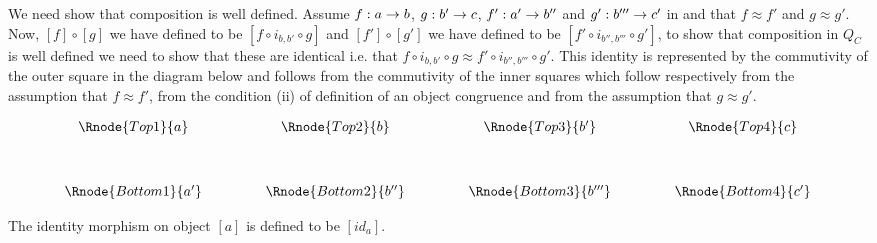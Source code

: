 \documentclass[10pt,a4paper]{scrartcl}
\begin{document}
We need show that composition is well defined.  Assume $f:a \rightarrow b$, $g: b' \rightarrow c$, $f':a' \rightarrow b''$ and $g': b''' \rightarrow c'$ in \catcw and that
$f \approx f'$ and $g \approx g'$.
Now,  
$[f] \circ [g]$ we have defined to be $[f \circ i_{b,b'} \circ g]$  and $[f']  \circ [g']$ we have defined to be $[f' \circ i_{b'',b'''} \circ g']$,
to show that composition in $Q_C$ is well defined we need to show that these are identical i.e. that $f \circ i_{b,b'} \circ g \approx f' \circ i_{b'',b'''} \circ g'$. This identity
is represented by the commutivity of the outer square in the diagram below and follows from the commutivity of the inner squares which follow respectively from the assumption that $f \approx f'$,
from the condition (ii) of definition of an object congruence and from the assumption that $g \approx g'$.

\vspace{3mm}
\begin{center}
\begin{displaymath}
\begin{array}{cp{.9cm}cp{.9cm}cp{.9cm}c}
\Rnode{Top1}{a} & & \Rnode{Top2}{b}  & & \Rnode{Top3}{b'} && \Rnode{Top4}{c}\\ [1.2cm]
\Rnode{Bottom1}{a'} & & \Rnode{Bottom2}{b''}  & & \Rnode{Bottom3}{b'''} && \Rnode{Bottom4}{c'}
\end{array}
\end{displaymath}
\end{center}


The identity morphism on object $[a]$ is defined to be $[id_a]$.
\end{document}
